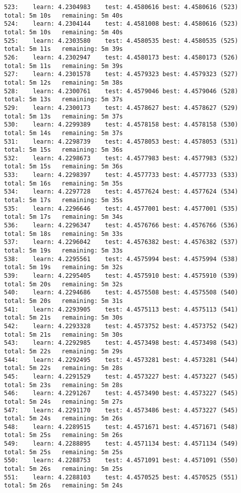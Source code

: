 \documentclass[11pt]{article}
\begin{document}
\begin{Verbatim}[commandchars=\\\{\}]
523:	learn: 4.2304983	test: 4.4580616	best: 4.4580616 (523)	total: 5m 10s	remaining: 5m 40s
524:	learn: 4.2304144	test: 4.4581008	best: 4.4580616 (523)	total: 5m 10s	remaining: 5m 40s
525:	learn: 4.2303580	test: 4.4580535	best: 4.4580535 (525)	total: 5m 11s	remaining: 5m 39s
526:	learn: 4.2302947	test: 4.4580173	best: 4.4580173 (526)	total: 5m 11s	remaining: 5m 39s
527:	learn: 4.2301578	test: 4.4579323	best: 4.4579323 (527)	total: 5m 12s	remaining: 5m 38s
528:	learn: 4.2300761	test: 4.4579046	best: 4.4579046 (528)	total: 5m 13s	remaining: 5m 37s
529:	learn: 4.2300173	test: 4.4578627	best: 4.4578627 (529)	total: 5m 13s	remaining: 5m 37s
530:	learn: 4.2299389	test: 4.4578158	best: 4.4578158 (530)	total: 5m 14s	remaining: 5m 37s
531:	learn: 4.2298739	test: 4.4578053	best: 4.4578053 (531)	total: 5m 15s	remaining: 5m 36s
532:	learn: 4.2298673	test: 4.4577983	best: 4.4577983 (532)	total: 5m 15s	remaining: 5m 36s
533:	learn: 4.2298397	test: 4.4577733	best: 4.4577733 (533)	total: 5m 16s	remaining: 5m 35s
534:	learn: 4.2297728	test: 4.4577624	best: 4.4577624 (534)	total: 5m 17s	remaining: 5m 35s
535:	learn: 4.2296646	test: 4.4577001	best: 4.4577001 (535)	total: 5m 17s	remaining: 5m 34s
536:	learn: 4.2296347	test: 4.4576766	best: 4.4576766 (536)	total: 5m 18s	remaining: 5m 33s
537:	learn: 4.2296042	test: 4.4576382	best: 4.4576382 (537)	total: 5m 19s	remaining: 5m 33s
538:	learn: 4.2295561	test: 4.4575994	best: 4.4575994 (538)	total: 5m 19s	remaining: 5m 32s
539:	learn: 4.2295405	test: 4.4575910	best: 4.4575910 (539)	total: 5m 20s	remaining: 5m 32s
540:	learn: 4.2294686	test: 4.4575508	best: 4.4575508 (540)	total: 5m 20s	remaining: 5m 31s
541:	learn: 4.2293905	test: 4.4575113	best: 4.4575113 (541)	total: 5m 21s	remaining: 5m 30s
542:	learn: 4.2293328	test: 4.4573752	best: 4.4573752 (542)	total: 5m 21s	remaining: 5m 30s
543:	learn: 4.2292985	test: 4.4573498	best: 4.4573498 (543)	total: 5m 22s	remaining: 5m 29s
544:	learn: 4.2292495	test: 4.4573281	best: 4.4573281 (544)	total: 5m 22s	remaining: 5m 28s
545:	learn: 4.2291529	test: 4.4573227	best: 4.4573227 (545)	total: 5m 23s	remaining: 5m 28s
546:	learn: 4.2291267	test: 4.4573490	best: 4.4573227 (545)	total: 5m 24s	remaining: 5m 27s
547:	learn: 4.2291170	test: 4.4573486	best: 4.4573227 (545)	total: 5m 24s	remaining: 5m 26s
548:	learn: 4.2289515	test: 4.4571671	best: 4.4571671 (548)	total: 5m 25s	remaining: 5m 26s
549:	learn: 4.2288895	test: 4.4571134	best: 4.4571134 (549)	total: 5m 25s	remaining: 5m 25s
550:	learn: 4.2288753	test: 4.4571091	best: 4.4571091 (550)	total: 5m 26s	remaining: 5m 25s
551:	learn: 4.2288103	test: 4.4570525	best: 4.4570525 (551)	total: 5m 26s	remaining: 5m 24s

\end{Verbatim}
\end{document}
